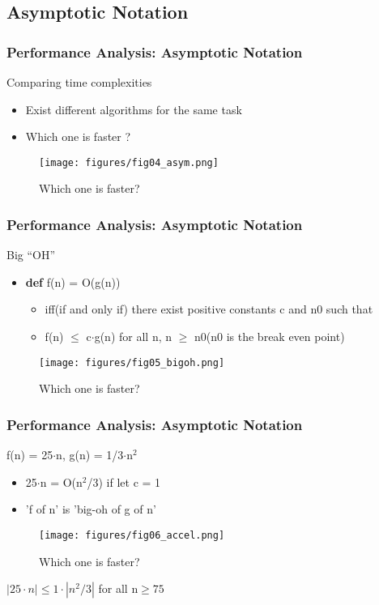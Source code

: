 \documentclass[newPxFont,sthlmFooter,nooffset]{beamer}
\begin{document}
\subsection{Asymptotic Notation}
\begin{frame}[t]
  \frametitle{Performance Analysis: Asymptotic Notation}
Comparing time complexities
\begin{itemize}
\item Exist different algorithms for the same task
\item Which one is faster ?
\end{itemize}
  \begin{figure}[h]
    \centering
    \texttt{[image: figures/fig04\_asym.png]}
    \caption{Which one is faster?}
  \end{figure}
\end{frame}

\begin{frame}[t]
  \frametitle{Performance Analysis: Asymptotic Notation}
Big ``OH''
\begin{itemize}
\item \textbf{def} f(n) = O(g(n))
  \begin{itemize}
  \item iff(if and only if) there exist positive constants c and n0 such that
  \item f(n) $\leq$ c$\cdot$g(n) for all n, n $\geq$ n0(n0 is the break even point)
  \end{itemize}
\end{itemize}
  \begin{figure}[h]
    \centering
    \texttt{[image: figures/fig05\_bigoh.png]}
    \caption{Which one is faster?}
  \end{figure}
\end{frame}

\begin{frame}[t]
  \frametitle{Performance Analysis: Asymptotic Notation}
 f(n) = 25$\cdot$n, g(n) = 1/3$\cdot$n$^2$ 
\begin{itemize}
\item 25$\cdot$n = O(n$^2$/3) if let c = 1
\item 'f of n' is 'big-oh of g of n'
\end{itemize}

  \begin{figure}[h]
    \centering
    \texttt{[image: figures/fig06\_accel.png]}
    \caption{Which one is faster?}
  \end{figure}
$ |25\cdot n|  \leq 1\cdot|n^2/3|$ for all n$ \geq  75$
\end{frame}
\end{document}
